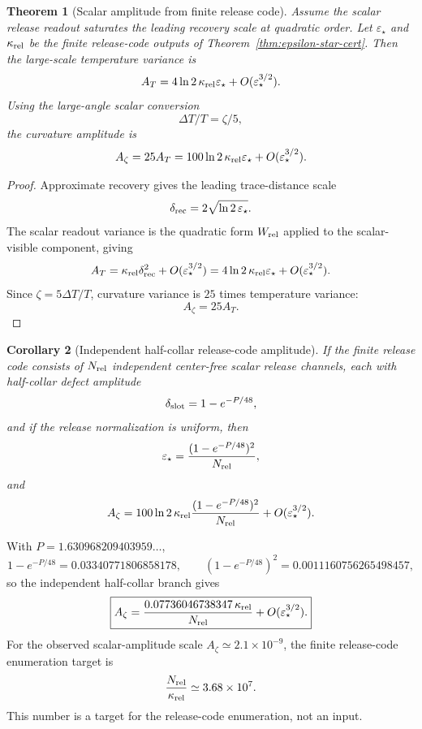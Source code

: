 \documentclass[11pt]{article}
\newtheorem{theorem}{Theorem}[section]
\newtheorem{corollary}[theorem]{Corollary}
\begin{document}
\begin{theorem}[Scalar amplitude from finite release code]\label{thm:scalar-amplitude}
Assume the scalar release readout saturates the leading recovery scale at quadratic order. Let
\(\varepsilon_\star\) and \(\kappa_{\rm rel}\) be the finite release-code outputs of
Theorem~\ref{thm:epsilon-star-cert}. Then the large-scale temperature variance is
\[
A_T
=
4\ln2\,\kappa_{\rm rel}\varepsilon_\star
+O(\varepsilon_\star^{3/2}).
\]
Using the large-angle scalar conversion
\[
\Delta T/T=\zeta/5,
\]
the curvature amplitude is
\[
A_\zeta
=
25A_T
=
100\ln2\,\kappa_{\rm rel}\varepsilon_\star
+O(\varepsilon_\star^{3/2}).
\]
\end{theorem}

\begin{proof}
Approximate recovery gives the leading trace-distance scale
\[
\delta_{\rm rec}
=
2\sqrt{\ln2\,\varepsilon_\star}.
\]
The scalar readout variance is the quadratic form \(W_{\rm rel}\) applied to the scalar-visible
component, giving
\[
A_T
=
\kappa_{\rm rel}\delta_{\rm rec}^2
+O(\varepsilon_\star^{3/2})
=
4\ln2\,\kappa_{\rm rel}\varepsilon_\star
+O(\varepsilon_\star^{3/2}).
\]
Since \(\zeta=5\Delta T/T\), curvature variance is \(25\) times temperature variance:
\[
A_\zeta=25A_T.
\]
\end{proof}

\begin{corollary}[Independent half-collar release-code amplitude]\label{cor:independent-release-amplitude}
If the finite release code consists of \(N_{\rm rel}\) independent center-free scalar release
channels, each with half-collar defect amplitude
\[
\delta_{\rm slot}=1-e^{-P/48},
\]
and if the release normalization is uniform, then
\[
\varepsilon_\star
=
\frac{(1-e^{-P/48})^2}{N_{\rm rel}},
\]
and
\[
A_\zeta
=
100\ln2\,\kappa_{\rm rel}
\frac{(1-e^{-P/48})^2}{N_{\rm rel}}
+O(\varepsilon_\star^{3/2}).
\]
\end{corollary}

With \(P=1.630968209403959\ldots\),
\[
1-e^{-P/48}=0.03340771806858178,\qquad
(1-e^{-P/48})^2=0.0011160756265498457,
\]
so the independent half-collar branch gives
\[
\boxed{
A_\zeta
=
\frac{0.07736046738347\,\kappa_{\rm rel}}{N_{\rm rel}}
+O(\varepsilon_\star^{3/2}).
}
\]
For the observed scalar-amplitude scale \(A_\zeta\simeq2.1\times10^{-9}\), the finite release-code
enumeration target is
\[
\frac{N_{\rm rel}}{\kappa_{\rm rel}}\simeq3.68\times10^7.
\]
This number is a target for the release-code enumeration, not an input.
\end{document}
